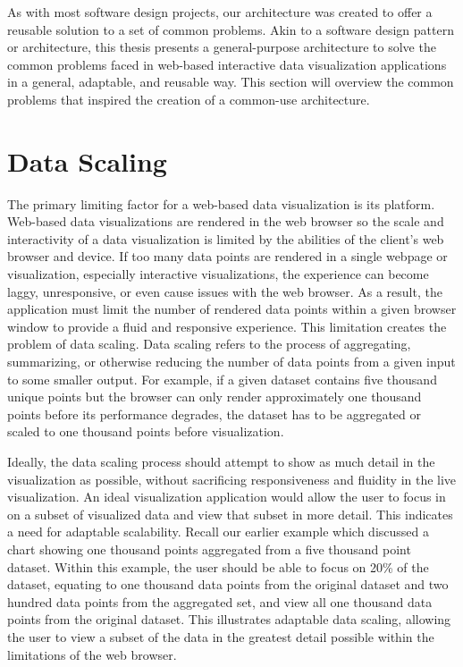 %
%

As with most software design projects, our architecture was created to offer a reusable solution to a set of common problems.  Akin to a software design pattern or architecture, this thesis presents a general-purpose architecture to solve the common problems faced in web-based interactive data visualization applications in a general, adaptable, and reusable way.  This section will overview the common problems that inspired the creation of a common-use architecture. \par

\section{Data Scaling}
The primary limiting factor for a web-based data visualization is its platform.  Web-based data visualizations are rendered in the web browser so the scale and interactivity of a data visualization is limited by the abilities of the client’s web browser and device.  If too many data points are rendered in a single webpage or visualization, especially interactive visualizations, the experience can become laggy, unresponsive, or even cause issues with the web browser.  As a result, the application must limit the number of rendered data points within a given browser window to provide a fluid and responsive experience. This limitation creates the problem of data scaling. Data scaling refers to the process of aggregating, summarizing, or otherwise reducing the number of data points from a given input to some smaller output.  For example, if a given dataset contains five thousand unique points but the browser can only render approximately one thousand points before its performance degrades, the dataset has to be aggregated or scaled to one thousand points before visualization. \par
Ideally, the data scaling process should attempt to show as much detail in the visualization as possible, without sacrificing responsiveness and fluidity in the live visualization.  An ideal visualization application would allow the user to focus in on a subset of visualized data and view that subset in more detail.  This indicates a need for adaptable scalability.  Recall our earlier example which discussed a chart showing one thousand points aggregated from a five thousand point dataset.  Within this example, the user should be able to focus on 20\% of the dataset, equating to one thousand data points from the original dataset and two hundred data points from the aggregated set, and view all one thousand data points from the original dataset.  This illustrates adaptable data scaling, allowing the user to view a subset of the data in the greatest detail possible within the limitations of the web browser. \par
